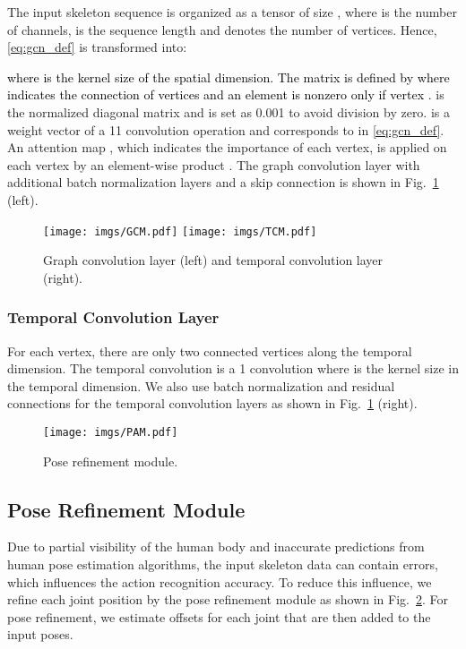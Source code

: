 \documentclass[letterpaper, 10 pt, conference]{ieeeconf}
\newcommand{\todo}[1]{{\textcolor{black}{#1}}}
\begin{document}
The input skeleton sequence is organized as a tensor of size , where  is the number of channels,  is the sequence length and  denotes the number of vertices.
Hence, \eqref{eq:gcn_def} is transformed into:

\todo{where  is the kernel size of the spatial dimension. The matrix  is defined by  where  indicates the connection of vertices and an element  is nonzero only if vertex .}
 is the normalized diagonal matrix and  is set as 0.001 to avoid division by zero.
 is a weight vector of a 11 convolution operation and corresponds to  in \eqref{eq:gcn_def}.
An attention map , which indicates the importance of each vertex, is applied on each vertex by an element-wise product .
The graph convolution layer with additional batch normalization layers and a skip connection is shown in Fig.~\ref{fig:TCM} (left).  

\begin{figure}[t]\centering
    \texttt{[image: imgs/GCM.pdf]}
    \texttt{[image: imgs/TCM.pdf]} 
    \caption{Graph convolution layer (left) and temporal convolution layer (right).}
    \label{fig:TCM}
    \vspace{-2mm}
\end{figure}






\subsubsection{Temporal Convolution Layer}

For each vertex, there are only two connected vertices along the temporal dimension. The temporal convolution is a   1 convolution where  is the kernel size in the temporal dimension. We also use batch normalization and residual connections for the temporal convolution layers as shown in Fig.~\ref{fig:TCM} (right).






\begin{figure}[t]\centering
    \texttt{[image: imgs/PAM.pdf]}
    \caption{Pose refinement module.}
    \label{fig:pam}
\end{figure}

\subsection{Pose Refinement Module}
Due to partial visibility of the human body and inaccurate predictions from human pose estimation algorithms, the input skeleton data can contain errors, which influences the action recognition accuracy. To reduce this influence, we refine each joint position by the pose refinement module as shown in Fig.~\ref{fig:pam}. For pose refinement, we estimate offsets for each joint that are then added to the input poses.
\end{document}
